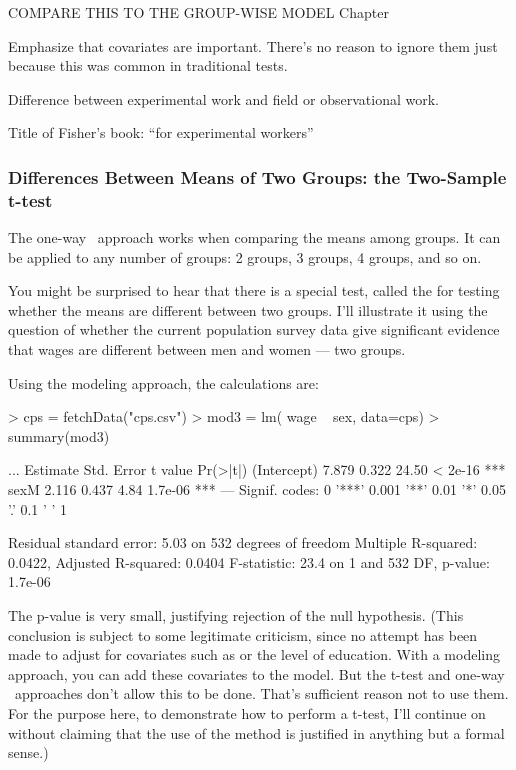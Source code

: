 


COMPARE THIS TO THE GROUP-WISE MODEL Chapter

Emphasize that covariates are important.  There's no reason to ignore
them just because this was common in traditional tests.

Difference between experimental work and field or observational work.

Title of Fisher's book: ``for experimental workers''

\subsubsection{Differences Between Means of Two Groups: the Two-Sample t-test}

The one-way \ANOVA\ approach works when comparing the means among
groups.  It can be applied to any number of groups: 2 groups, 3
groups, 4 groups, and so on.

You might be surprised to hear that there is a special test, called
the  for testing whether the means are
different between two groups.  I'll illustrate it using the question
of whether the current population survey data give 
significant evidence that wages are different between men and women
--- two groups.



Using the modeling approach, the calculations are:
\begin{Schunk}
\begin{Sinput}
> cps = fetchData("cps.csv")
> mod3 = lm( wage ~ sex, data=cps)
> summary(mod3)
\end{Sinput}
\begin{Soutput}
...
            Estimate Std. Error t value Pr(>|t|)    
(Intercept)    7.879      0.322   24.50  < 2e-16 ***
sexM           2.116      0.437    4.84  1.7e-06 ***
---
Signif. codes:  0 '***' 0.001 '**' 0.01 '*' 0.05 '.' 0.1 ' ' 1 

Residual standard error: 5.03 on 532 degrees of freedom
Multiple R-squared: 0.0422,	Adjusted R-squared: 0.0404 
F-statistic: 23.4 on 1 and 532 DF,  p-value: 1.7e-06 
\end{Soutput}
\end{Schunk}
The p-value is very small, justifying rejection of the null
hypothesis.  (This conclusion is subject to some legitimate
criticism, since no attempt has been made to adjust for covariates
such as  or the level of education.  With a modeling approach,
you can add these covariates to the model.  But the t-test and one-way
\ANOVA\ approaches don't allow this to be done.  That's sufficient
reason not to use them.  For the purpose here, to demonstrate how to
perform a t-test, I'll continue on without claiming that the use of
the method is justified in anything but a formal sense.)

